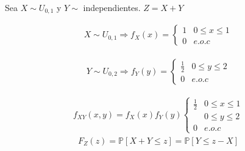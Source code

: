 \begin{Ejem}
Sea $X\sim U_{0,1}$ y $Y \sim$ independientes.  $Z=X+Y$


\begin{eqnarray*}
X\sim U_{0,1} \Rightarrow f_{X}\left( x \right)= 
\begin{cases}
1 & 0\leq x \leq 1\\
0 & e.o.c
\end{cases}
\end{eqnarray*}

\begin{eqnarray*}
Y\sim U_{0,2} \Rightarrow f_{Y}\left( y \right)= 
\begin{cases}
\frac{1}{2} & 0\leq y \leq 2\\
0 & e.o.c
\end{cases}
\end{eqnarray*}

\begin{eqnarray*}
 f_{XY}\left( x,y \right)= f_{X}\left(x\right)f_{Y}\left(y\right)
\begin{cases}
\frac{1}{2} & 0\leq x \leq 1\\
& 0\leq y \leq 2\\
0 & e.o.c
\end{cases}
\end{eqnarray*}
\begin{eqnarray*}
F_{Z}\left(z\right)= \mathbb{P}\left[X+Y\leq z \right]= \mathbb{P}\left[Y \leq z-X \right]
\end{eqnarray*}
\end{Ejem}

